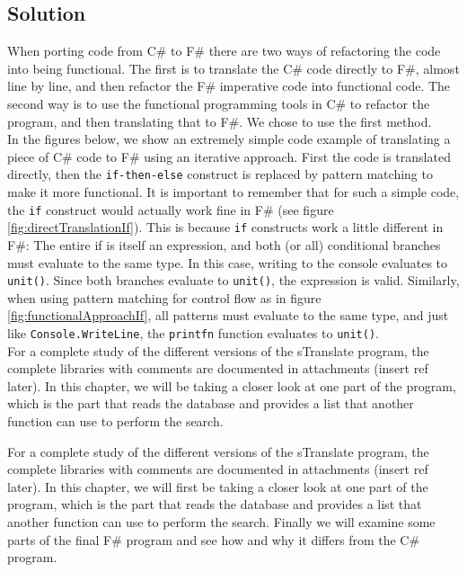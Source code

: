 \documentclass[12pt, a4paper]{article}
\newcommand{\code}[1]{{\small \texttt{#1}}}
\begin{document}
\newpage

\subsection{Solution}
When porting code from C\# to F\# there are two ways of refactoring the code into being functional. The first is to translate the C\# code directly to F\#, almost line by line, and then refactor the F\# imperative code into functional code. The second way is to use the functional programming tools in C\# to refactor the program, and then translating that to F\#. We chose to use the first method.\\

In the figures below, we show an extremely simple code example of translating a piece of C\# code to F\# using an iterative approach. First the code is translated directly, then the \code{if-then-else} construct is replaced by pattern matching to make it more functional. It is important to remember that for such a simple code, the \code{if} construct would actually work fine in F\# (see figure \ref{fig:directTranslationIf}). This is because \code{if} constructs work a little different in F\#: The entire if is itself an expression, and both (or all) conditional branches must evaluate to the same type. In this case, writing to the console evaluates to \code{unit()}. Since both branches evaluate to \code{unit()}, the expression is valid. Similarly, when using pattern matching for control flow as in figure \ref{fig:functionalApproachIf}, all patterns must evaluate to the same type, and just like \code{Console.WriteLine}, the \code{printfn} function evaluates to \code{unit()}.\\

For a complete study of the different versions of the sTranslate program, the complete libraries with comments are documented in attachments (insert ref later). In this chapter, we will be taking a closer look at one part of the program, which is the part that reads the database and provides a list that another function can use to perform the search.

\newpage
For a complete study of the different versions of the sTranslate program, the complete libraries with comments are documented in attachments (insert ref later). In this chapter, we will first be taking a closer look at one part of the program, which is the part that reads the database and provides a list that another function can use to perform the search. Finally we will examine some parts of the final F\# program and see how and why it differs from the C\# program.
\end{document}
